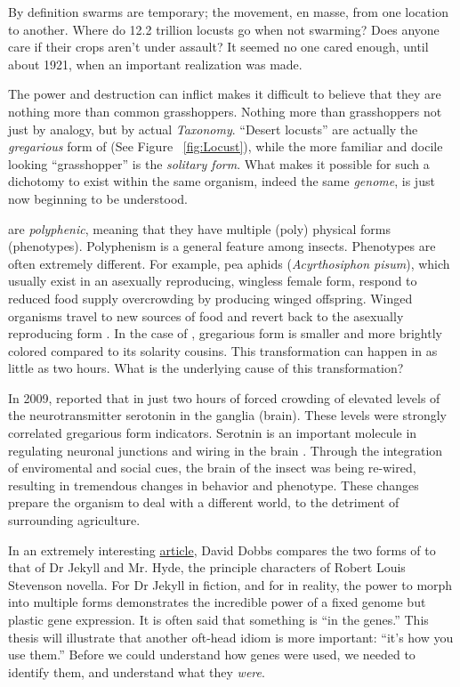 By definition swarms are temporary; the movement, en masse, from one location to another. Where do 12.2 trillion locusts go when not swarming? Does anyone care if their crops aren't under assault? It seemed no one cared enough, until about 1921, when an important realization was made.

The power and destruction \locusts{} can inflict makes it difficult to believe that they are nothing more than common grasshoppers. Nothing more than grasshoppers not just by analogy, but by actual \textit{Taxonomy}. ``Desert locusts'' are actually the \textit{gregarious} form  of \locusts{} (See Figure ~\ref{fig:Locust}), while the more familiar and docile looking ``grasshopper'' is the \textit{solitary form}. What makes it possible for such a dichotomy to exist within the same organism, indeed the same \textit{genome}, is just now beginning to be understood.

\locusts{} are \textit{polyphenic}, meaning that they have multiple (poly) physical forms (phenotypes). Polyphenism is a general feature among insects. Phenotypes are often extremely different. For example, pea aphids (\textit{Acyrthosiphon pisum}), which usually exist in an asexually reproducing, wingless female form, respond to reduced food supply overcrowding by producing winged offspring. Winged organisms travel to new sources of food and revert back to the asexually reproducing form \citep{Shingleton2003,Purandare2014b}. In the case of \locusts{}, gregarious form is smaller and more brightly colored compared to its solarity cousins. This transformation can happen in as little as two hours. What is the underlying cause of this transformation?

In 2009, \citet{Anstey2009} reported that in just two hours of forced crowding of \locusts{} elevated levels of the neurotransmitter serotonin in the ganglia (brain). These levels were strongly correlated gregarious form indicators.
Serotnin is an important molecule in regulating neuronal junctions and wiring in the brain \citep{Hoeffer2003}. Through the integration of enviromental and social cues, the brain of the insect was being re-wired, resulting in tremendous changes in behavior and phenotype. These changes prepare the organism to deal with a different world, to the detriment of surrounding agriculture.

In an extremely interesting \href{http://aeon.co/magazine/nature-and-cosmos/why-its-time-to-lay-the-selfish-gene-to-rest/}{article}, David Dobbs compares the two forms of \locusts{} to that of Dr Jekyll and Mr. Hyde, the principle characters of Robert Louis Stevenson novella. For Dr Jekyll in fiction, and for \locusts{} in reality, the power to morph into multiple forms demonstrates the incredible power of a fixed genome but plastic gene expression. It is often said that something is ``in the genes.'' This thesis will illustrate that another oft-head idiom is more important: ``it's how you use them.'' Before we could understand how genes were used, we needed to identify them, and understand what they \textit{were}. 


